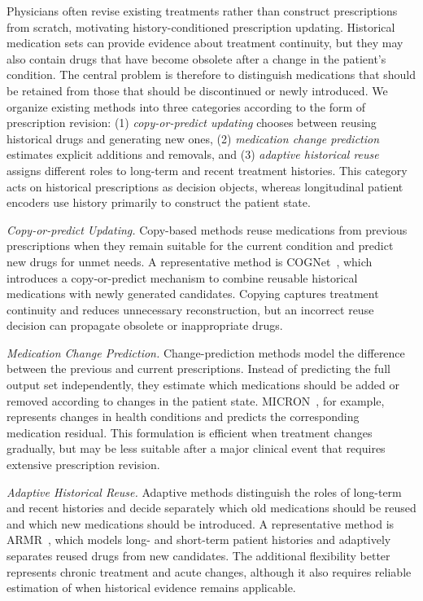 \documentclass[manuscript,review]{acmart}
\begin{document}
 Physicians often revise existing treatments rather than construct prescriptions from scratch, motivating history-conditioned prescription updating. Historical medication sets can provide evidence about treatment continuity, but they may also contain drugs that have become obsolete after a change in the patient's condition. The central problem is therefore to distinguish medications that should be retained from those that should be discontinued or newly introduced. We organize existing methods into three categories according to the form of prescription revision: (1) \textit{copy-or-predict updating} chooses between reusing historical drugs and generating new ones, (2) \textit{medication change prediction} estimates explicit additions and removals, and (3) \textit{adaptive historical reuse} assigns different roles to long-term and recent treatment histories. This category acts on historical prescriptions as decision objects, whereas longitudinal patient encoders use history primarily to construct the patient state.

\textit{Copy-or-predict Updating.} Copy-based methods reuse medications from previous prescriptions when they remain suitable for the current condition and predict new drugs for unmet needs. A representative method is COGNet~\cite{wu2022cognet}, which introduces a copy-or-predict mechanism to combine reusable historical medications with newly generated candidates. Copying captures treatment continuity and reduces unnecessary reconstruction, but an incorrect reuse decision can propagate obsolete or inappropriate drugs.

\textit{Medication Change Prediction.} Change-prediction methods model the difference between the previous and current prescriptions. Instead of predicting the full output set independently, they estimate which medications should be added or removed according to changes in the patient state. MICRON~\cite{yang2021micron}, for example, represents changes in health conditions and predicts the corresponding medication residual. This formulation is efficient when treatment changes gradually, but may be less suitable after a major clinical event that requires extensive prescription revision.

\textit{Adaptive Historical Reuse.} Adaptive methods distinguish the roles of long-term and recent histories and decide separately which old medications should be reused and which new medications should be introduced. A representative method is ARMR~\cite{wu2025armr}, which models long- and short-term patient histories and adaptively separates reused drugs from new candidates. The additional flexibility better represents chronic treatment and acute changes, although it also requires reliable estimation of when historical evidence remains applicable.
\end{document}
